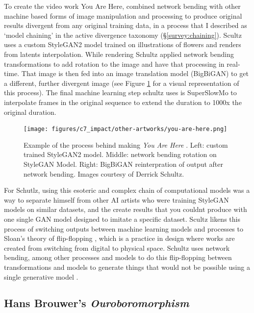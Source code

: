 To create the video work You Are Here, \citep{schutlz2020you} combined network bending with other machine based forms of image manipulation and processing to produce original results divergent from any original training data, in a process that I described as `model chaining' in the active divergence taxonomy (\S \ref{survey:chaining}).
Scultz uses a custom StyleGAN2 model trained on illustrations of flowers and renders from latents interpolation. 
While rendering Schultz applied network bending transformations to add rotation to the image and have that processing in real-time. 
That image is then fed into an image translation model (BigBiGAN) \citep{donahue2019large} to get a different, further divergent image (see Figure \ref{fig:c7:you-are-here} for a visual representation of this process). 
The final machine learning step schultz uses is SuperSlowMo \citep{jiang2018super} to interpolate frames in the original sequence to extend the duration to 1000x the original duration.

\begin{figure}[!htb]
    \centering
    \captionsetup{justification=centering}
    \texttt{[image: figures/c7\_impact/other-artworks/you-are-here.png]}
    \caption[Example of the process behind making \textit{You Are Here}]{Example of the process behind making \textit{You Are Here} \citep{schutlz2020you}. Left: custom trained StyleGAN2 model. Middle: network bending rotation on StyleGAN Model. Right: BigBiGAN reinterpration of output after network bending. Images courtesy of Derrick Schultz.}
    \label{fig:c7:you-are-here}
\end{figure}

For Schutlz, using this esoteric and complex chain of computational models was a way to separate himself from other AI artists who were training StyleGAN models on similar datasets, and the create results that you couldnt produce with one single GAN model designed to imitate a specific dataset. 
Scultz likens this process of switching outputs between machine learning models and processes to Sloan's theory of flip-flopping \citeyearpar{sloan2012flipflop}, which is a practice in design where works are created from switching from digital to physical space. Schultz uses network bending, among other processes and models to do this flip-flopping between transformations and models to generate things that would not be possible using a single generative model \citep{schultz2021personal}.

\subsection{Hans Brouwer's \textit{Ouroboromorphism}}

